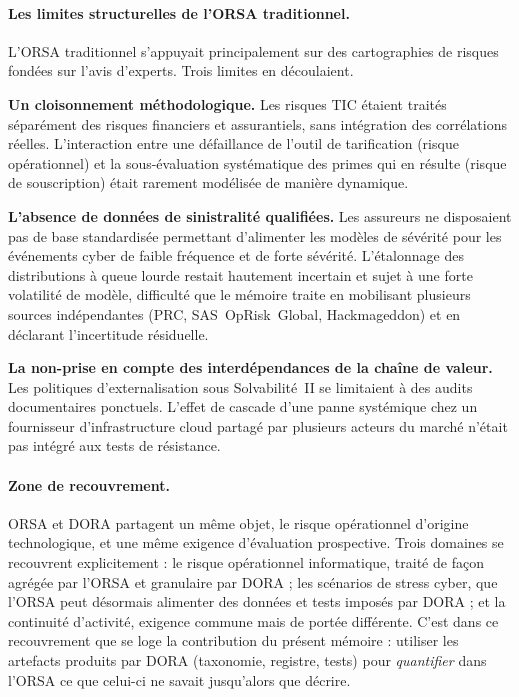 \paragraph{Les limites structurelles de l'ORSA traditionnel.} L'ORSA
traditionnel s'appuyait principalement sur des cartographies de risques
fondées sur l'avis d'experts. Trois limites en découlaient.

\textbf{Un cloisonnement méthodologique.} Les risques TIC étaient traités séparément des
risques financiers et assurantiels, sans intégration des corrélations réelles.
L'interaction entre une défaillance de l'outil de tarification (risque opérationnel) et
la sous-évaluation systématique des primes qui en résulte (risque de souscription) était
rarement modélisée de manière dynamique.

\textbf{L'absence de données de sinistralité qualifiées.} Les assureurs ne disposaient
pas de base standardisée permettant d'alimenter les modèles de sévérité pour les
événements cyber de faible fréquence et de forte sévérité. L'étalonnage des distributions
à queue lourde restait hautement incertain et sujet à une forte volatilité de modèle,
difficulté que le mémoire traite en mobilisant plusieurs sources indépendantes
(PRC, SAS~OpRisk~Global, Hackmageddon) et en déclarant l'incertitude résiduelle.

\textbf{La non-prise en compte des interdépendances de la chaîne de valeur.} Les
politiques d'externalisation sous Solvabilité~II se limitaient à des audits documentaires
ponctuels. L'effet de cascade d'une panne systémique chez un fournisseur d'infrastructure
cloud partagé par plusieurs acteurs du marché n'était pas intégré aux tests de résistance.

\paragraph{Zone de recouvrement.} ORSA et DORA partagent un même objet, le risque opérationnel d'origine technologique,
et une même exigence d'évaluation prospective. Trois domaines se recouvrent
explicitement : le risque opérationnel informatique, traité de façon agrégée par l'ORSA
et granulaire par DORA ; les scénarios de stress cyber, que l'ORSA peut désormais alimenter
des données et tests imposés par DORA ; et la continuité d'activité, exigence commune mais
de portée différente. C'est dans ce recouvrement que se loge la contribution du présent
mémoire : utiliser les artefacts produits par DORA (taxonomie, registre, tests) pour
\emph{quantifier} dans l'ORSA ce que celui-ci ne savait jusqu'alors que décrire.

